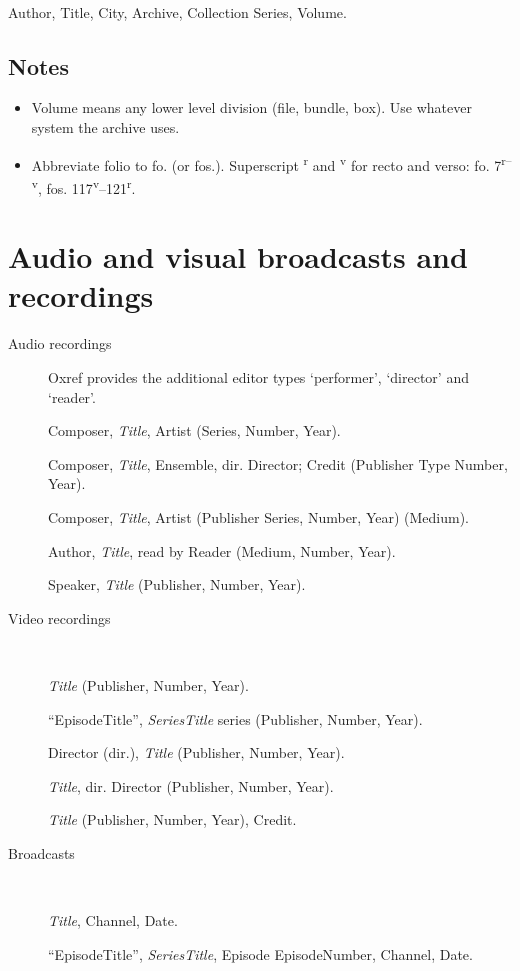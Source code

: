 \documentclass[extrafontsizes,11pt,a4paper,oneside]{memoir}
\newcommand*{\lit}[1]{\textsf{#1}}
\newcommand*{\code}[1]{`\textsf{#1}'}
\begin{document}
\begin{description}
  \item[Form]~
  \item Author, Title, City, Archive, Collection Series, Volume.
\end{description}

\section{Notes}

\begin{itemize}
  \item Volume means any lower level division (file, bundle, box). Use whatever system the archive uses.
  \item Abbreviate folio to fo. (or fos.). Superscript \textsuperscript{r} and \textsuperscript{v} for recto and verso: fo. 7\textsuperscript{r--v}, fos. 117\textsuperscript{v}--121\textsuperscript{r}.
\end{itemize}

\chapter{Audio and visual broadcasts and recordings}\label{sec:audiovideo}

\begin{description}
  \item[Audio recordings] Oxref provides the additional editor types \code{performer}, \code{director} and \code{reader}.
  \par Composer, \emph{Title}, Artist (Series, Number, Year).
  \\
  \par Composer, \emph{Title}, Ensemble, \lit{dir.} Director; Credit (Publisher Type Number, Year).
  \\
  \par Composer, \emph{Title}, Artist (Publisher Series, Number, Year) (Medium).
  \\
  \par Author, \emph{Title}, \lit{read by} Reader (Medium, Number, Year).
  \\
  \par Speaker, \emph{Title} (Publisher, Number, Year).
  \item[Video recordings]~
  \par \emph{Title} (Publisher, Number, Year).
  \par \enquote{EpisodeTitle}, \emph{SeriesTitle} \lit{series} (Publisher, Number, Year).
  \par Director (\lit{dir.}), \emph{Title} (Publisher, Number, Year).
  \par \emph{Title}, \lit{dir.} Director (Publisher, Number, Year).
  \par \emph{Title} (Publisher, Number, Year), Credit.
  \item[Broadcasts]~
  \par \emph{Title}, Channel, Date.
  \par \enquote{EpisodeTitle}, \emph{SeriesTitle}, \lit{Episode} EpisodeNumber, Channel, Date.
\end{description}
\end{document}
